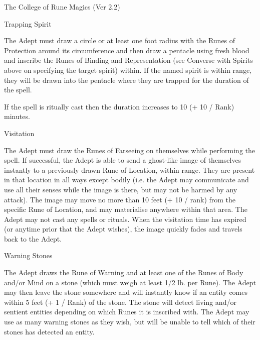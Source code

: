 \begin{Chapter}{The College of Rune Magics (Ver 2.2)}
\begin{spell}[S-15]{Trapping Spirit}

\begin{effects}
The Adept must draw a circle or at least one foot radius with the
Runes of Protection around its circumference and then draw a pentacle
using fresh blood and inscribe the Runes of Binding and Representation
(see Converse with Spirits above on specifying the target spirit)
within. If the named spirit is within range, they will be drawn into
the pentacle where they are trapped for the duration of the spell.

If the spell is ritually cast then the duration increases to 10 (+ 10
/ Rank) minutes.
\end{effects}
\end{spell}

\begin{spell}[S-16]{Visitation}

\begin{effects}
The Adept must draw the Runes of Farseeing on themselves while
performing the spell.  If successful, the Adept is able to send a
ghost-like image of themselves instantly to a previously drawn Rune of
Location, within range.  They are present in that location in all ways
except bodily (i.e. the Adept may communicate and use all their senses
while the image is there, but may not be harmed by any attack).  The
image may move no more than 10 feet (+ 10 / rank) from the specific
Rune of Location, and may materialise anywhere within that area.  The
Adept may not cast any spells or rituals. When the visitation time has
expired (or anytime prior that the Adept wishes), the image quickly
fades and travels back to the Adept.
\end{effects}
\end{spell}

\begin{spell}[S-17]{Warning Stones}

\begin{effects}
The Adept draws the Rune of Warning and at least one of the Runes of
Body and/or Mind on a stone (which must weigh at least 1/2 lb. per
Rune).  The Adept may then leave the stone somewhere and will
instantly know if an entity comes within 5 feet (+ 1 / Rank) of the
stone. The stone will detect living and/or sentient entities depending
on which Runes it is inscribed with.  The Adept may use as many
warning stones as they wish, but will be unable to tell which of their
stones has detected an entity.
\end{effects}
\end{spell}


\end{Chapter}
